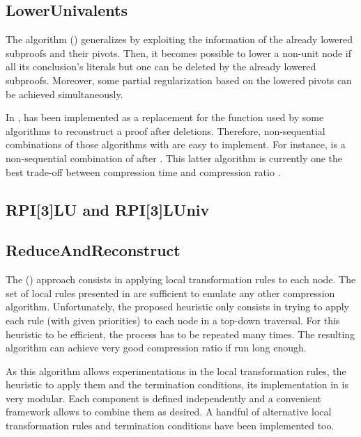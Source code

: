 \documentclass{llncs}
\begin{document}
\subsection{LowerUnivalents}

The  algorithm \cite{LUniv} () generalizes  by
exploiting the information of the already lowered subproofs and their pivots. Then, it becomes
possible to lower a non-unit node if all its conclusion's literals but one can be deleted by the
already lowered subproofs. Moreover, some partial regularization based on the lowered pivots can be
achieved simultaneously.

In \skeptik,  has been implemented as a replacement for the  function
used by some algorithms to reconstruct a proof after deletions. Therefore, non-sequential
combinations of those algorithms with  are easy to implement. For instance,
 is a non-sequential combination of  after . This latter
algorithm is currently one the best trade-off between compression time and compression ratio
\cite{LUniv}.

\subsection{RPI[3]LU and RPI[3]LUniv}

\subsection{ReduceAndReconstruct}

The  () approach consists in applying local transformation
rules to each node. The set of local rules presented in \cite{RedRec} are sufficient to emulate any
other compression algorithm. Unfortunately, the proposed heuristic only consists in trying to apply
each rule (with given priorities) to each node in a top-down traversal. For this heuristic to be
efficient, the process has to be repeated many times. The resulting algorithm can achieve very good
compression ratio if run long enough.

As this algorithm allows experimentations in the local transformation rules, the heuristic to apply
them and the termination conditions, its implementation in \skeptik is very modular. Each component
is defined independently and a convenient framework allows to combine them as desired. A handful of
alternative local transformation rules and termination conditions have been implemented too.
\end{document}
